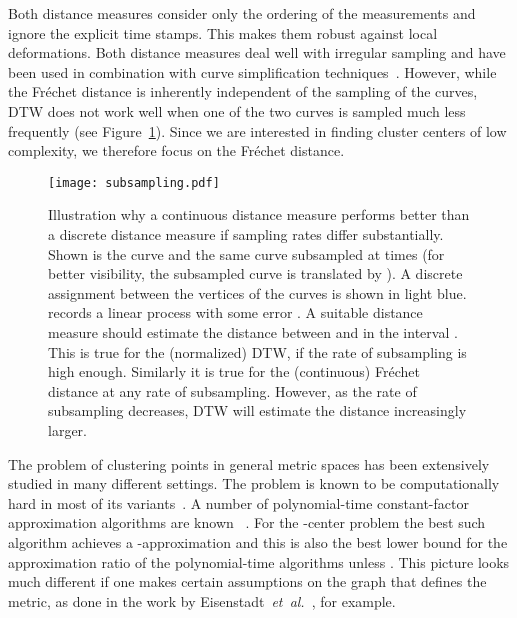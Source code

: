 \documentclass[11pt, letter]{article}
\newcommand{\etal}{\textit{e{}t~a{}l.}\xspace}
\newcommand{\figlab}[1]{\label{fig:#1}}
\newcommand{\figref}[1]{Figure~\ref{fig:#1}}
\newcommand{\Frechet}{Fr\'echet\xspace}
\begin{document}
Both distance measures consider
only the ordering of the measurements and ignore the explicit time stamps. This
makes them robust against local deformations.  Both distance measures deal well
with irregular sampling and have been used in combination with curve
simplification techniques~\cite{ahmw-nltcs-05,dhw-afd-12,keogh1999scaling}.
However, while the \Frechet distance is inherently independent of the sampling
of the curves, DTW does not work well when one of the two curves is sampled
much less frequently (see \figref{subsampling}). Since we are interested in finding cluster centers of low
complexity, we therefore focus on the \Frechet distance.

\begin{figure}\centering
\texttt{[image: subsampling.pdf]}
\caption{Illustration why a continuous distance measure performs better than a
discrete distance measure if sampling rates differ substantially. Shown is the
curve  and the same curve subsampled at times  (for
better visibility, the subsampled curve  is translated by ). A discrete 
assignment between the vertices of the curves is shown in light blue.
 records a linear process with some error . A suitable distance measure should estimate
the distance between  and  in the interval . This is true
for the (normalized) DTW, if the rate of subsampling is high enough. Similarly
it is true for the (continuous) \Frechet distance at any rate of subsampling. 
However, as the rate of subsampling decreases, DTW will estimate the distance
increasingly larger.
}
\figlab{subsampling}
\end{figure}

The problem of clustering points in general metric spaces has been extensively studied 
in many different settings. The problem is known to be computationally hard in most of its
variants~\cite{aloise2009nphard,jain2002greedy,megiddo1984geo,Vaziranibook}.
A number of polynomial-time constant-factor approximation algorithms are known 
~\cite{AryaGKMMP04,CharikarG05, cgts-kmedian-02, CharikarL12, c-kmc-09,feder1988optimal,Gonzalez1985,HochbaumShmoys1985,jain2002greedy,ls-akm-13}. 
For the -center problem the best such algorithm achieves a -approximation
\cite{Gonzalez1985, HochbaumShmoys1985} and this is also the best lower bound
for the approximation ratio of the polynomial-time algorithms unless . This picture
looks much different if one makes certain assumptions on the graph that defines
the metric, as done in the work by Eisenstadt~\etal~\cite{emk-akcpg-14}, for
example. 
\end{document}

